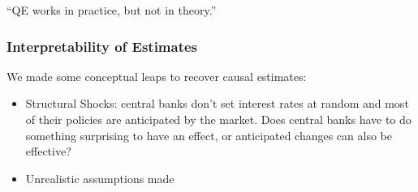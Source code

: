                 ``QE works in practice, but not in theory.''
                
            \subsubsection{Interpretability of Estimates}

                We made some conceptual leaps to recover causal estimates:
                \begin{itemize}
                    \item Structural Shocks: central banks don't set interest rates at random and most of their policies are anticipated by the market. Does central banks have to do something surprising to have an effect, or anticipated changes can also be effective?
                    \item Unrealistic assumptions made
                \end{itemize}
            
        
    